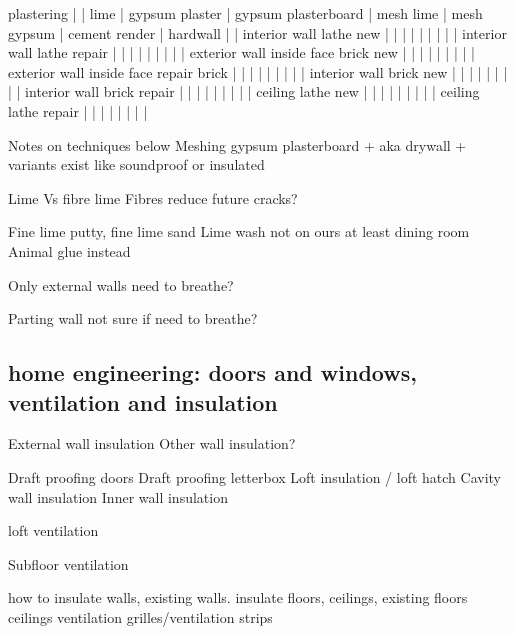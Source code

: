 plastering
|                                        | lime | gypsum plaster | gypsum plasterboard | mesh lime | mesh gypsum | cement render | hardwall |
| interior wall lathe new                |      |                |                     |           |             |               |          |
| interior wall lathe repair             |      |                |                     |           |             |               |          |
| exterior wall inside face brick new    |      |                |                     |           |             |               |          |
| exterior wall inside face repair brick |      |                |                     |           |             |               |          |
| interior wall brick new                |      |                |                     |           |             |               |          |
| interior wall brick repair             |      |                |                     |           |             |               |          |
| ceiling lathe new                      |      |                |                     |           |             |               |          |
| ceiling lathe repair                   |      |                |                     |           |             |               |          |

Notes on techniques below
Meshing
gypsum plasterboard
+ aka drywall
+ variants exist like soundproof or insulated

Lime Vs fibre lime
Fibres reduce future cracks?

Fine lime putty, fine lime sand
Lime wash not on ours at least dining room
Animal glue instead

Only external walls need to breathe?

Parting wall not sure if need to breathe?

\subsection{home engineering: doors and windows, ventilation and insulation}
External wall insulation
Other wall insulation?

Draft proofing doors
Draft proofing letterbox
Loft insulation / loft hatch
Cavity wall insulation
Inner wall insulation

loft ventilation

Subfloor ventilation

how to insulate walls, existing walls.
insulate floors, ceilings, existing floors ceilings
ventilation grilles/ventilation strips

